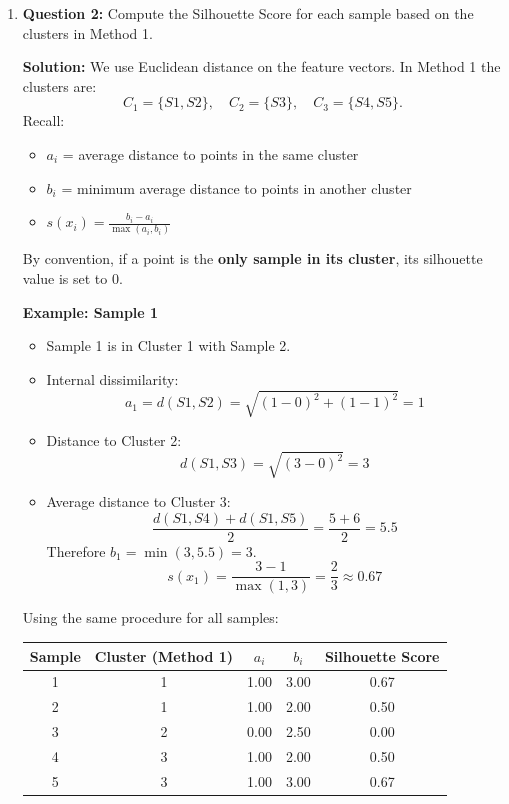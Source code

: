 \documentclass{article}
\begin{document}
\begin{enumerate}
    Thus, the Rand Index for Method 2 is:
    \[
    \text{Rand Index for Method 2} = \frac{a + d}{a + b + c + d} = \frac{0 + 6}{0+2+2+6} = 0.60
    \]
    
    Hence, the correct answer is \textbf{(a) Method 1: 0.80, Method 2: 0.60}.
    

    \item \textbf{Question 2:} \newline
Compute the Silhouette Score for each sample based on the clusters in Method 1. 
    
\textbf{Solution:} \newline
We use Euclidean distance on the feature vectors. In Method 1 the clusters are:
\[
C_1=\{S1,S2\}, \quad C_2=\{S3\}, \quad C_3=\{S4,S5\}.
\]
Recall:
\begin{itemize}
    \item $a_i$ = average distance to points in the same cluster
    \item $b_i$ = minimum average distance to points in another cluster
    \item $s(x_i)=\frac{b_i-a_i}{\max(a_i,b_i)}$
\end{itemize}
By convention, if a point is the \textbf{only sample in its cluster}, its silhouette value is set to $0$.

\vspace{5pt}
\textbf{Example: Sample 1}

\begin{itemize}
    \item Sample 1 is in Cluster 1 with Sample 2.
    \item Internal dissimilarity:
    \[
    a_1 = d(S1,S2) = \sqrt{(1-0)^2+(1-1)^2}=1
    \]
    \item Distance to Cluster 2:
    \[
    d(S1,S3)=\sqrt{(3-0)^2}=3
    \]
    \item Average distance to Cluster 3:
    \[
    \frac{d(S1,S4)+d(S1,S5)}{2}=\frac{5+6}{2}=5.5
    \]
    Therefore $b_1=\min(3,5.5)=3$.
    \[
    s(x_1)=\frac{3-1}{\max(1,3)}=\frac{2}{3}\approx0.67
    \]
\end{itemize}

Using the same procedure for all samples:

\begin{table}[H]
    \centering
    \begin{tabular}{|c|c|c|c|c|}
        \hline
        Sample & Cluster (Method 1) & $a_i$ & $b_i$ & Silhouette Score \\ \hline
        1 & 1 & 1.00 & 3.00 & 0.67 \\ \hline
        2 & 1 & 1.00 & 2.00 & 0.50 \\ \hline
        3 & 2 & 0.00 & 2.50 & 0.00 \\ \hline
        4 & 3 & 1.00 & 2.00 & 0.50 \\ \hline
        5 & 3 & 1.00 & 3.00 & 0.67 \\ \hline
    \end{tabular}
\end{table}


\end{enumerate}
\end{document}
